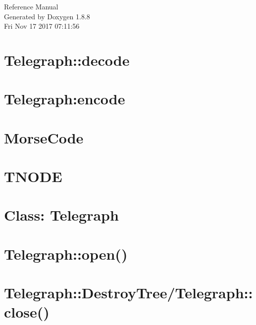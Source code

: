 \documentclass[twoside]{article}
\newcommand{\+}{\discretionary{\mbox{\scriptsize$\hookleftarrow$}}{}{}}
\begin{document}
\hypersetup{pageanchor=false,
             bookmarks=true,
             bookmarksnumbered=true,
             pdfencoding=unicode
            }
\begin{titlepage}
\vspace*{7cm}
\begin{center}%
{\Large Reference Manual}\\
\vspace*{1cm}
{\large Generated by Doxygen 1.8.8}\\
\vspace*{0.5cm}
{\small Fri Nov 17 2017 07:11:56}\\
\end{center}
\end{titlepage}
\tableofcontents
{}
\hypersetup{pageanchor=true}

\section{Telegraph\+:\+:decode}
\label{Telegraph_1_1decode}
\hypertarget{Telegraph_1_1decode}{}

\section{Telegraph\+:encode}
\label{Telegraph_1encode}
\hypertarget{Telegraph_1encode}{}

\section{Morse\+Code}
\label{MorseCode}
\hypertarget{MorseCode}{}

\section{T\+N\+O\+D\+E}
\label{TNODE}
\hypertarget{TNODE}{}

\section{Class\+: Telegraph}
\label{Class_1_01Telegraph}
\hypertarget{Class_1_01Telegraph}{}

\section{Telegraph\+:\+:open()}
\label{Telegraph_1_1open_07_08}
\hypertarget{Telegraph_1_1open_07_08}{}

\section{Telegraph\+:\+:Destroy\+Tree/\+Telegraph\+:\+:close()}
\label{Telegraph_1_1DestroyTree_2Telegraph_1_1close_07_08}
\hypertarget{Telegraph_1_1DestroyTree_2Telegraph_1_1close_07_08}{}

\end{document}
